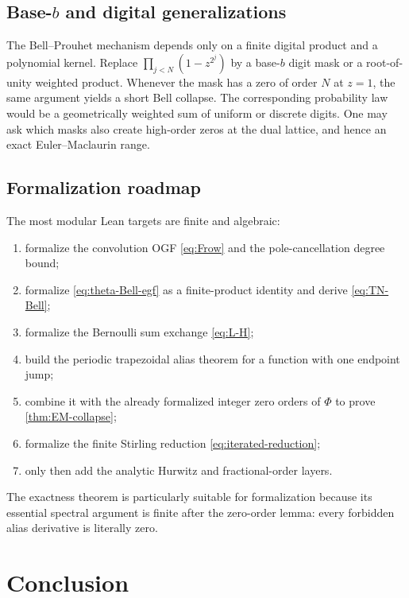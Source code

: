 \documentclass[11pt,oneside]{article}
\numberwithin{equation}{section}
\theoremstyle{definition}
\theoremstyle{remark}
\begin{document}
\subsection{\texorpdfstring{Base-\(b\)}{Base-b} and digital generalizations}

The Bell--Prouhet mechanism depends only on a finite digital product and a polynomial
kernel.  Replace
\(
 \prod_{j<N}(1-z^{2^j})
\)
by a base-\(b\) digit mask or a root-of-unity weighted product.  Whenever the mask has a
zero of order \(N\) at \(z=1\), the same argument yields a short Bell collapse.  The
corresponding probability law would be a geometrically weighted sum of uniform or
discrete digits.  One may ask which masks also create high-order zeros at the dual
lattice, and hence an exact Euler--Maclaurin range.

\subsection{Formalization roadmap}

The most modular Lean targets are finite and algebraic:
\begin{enumerate}
\item formalize the convolution OGF \eqref{eq:Frow} and the pole-cancellation degree
      bound;
\item formalize \eqref{eq:theta-Bell-egf} as a finite-product identity and derive
      \eqref{eq:TN-Bell};
\item formalize the Bernoulli sum exchange \eqref{eq:L-H};
\item build the periodic trapezoidal alias theorem for a function with one endpoint jump;
\item combine it with the already formalized integer zero orders of \(\Phi\) to prove
      \cref{thm:EM-collapse};
\item formalize the finite Stirling reduction \eqref{eq:iterated-reduction};
\item only then add the analytic Hurwitz and fractional-order layers.
\end{enumerate}
The exactness theorem is particularly suitable for formalization because its essential
spectral argument is finite after the zero-order lemma: every forbidden alias derivative
is literally zero.

\section{Conclusion}
\end{document}
